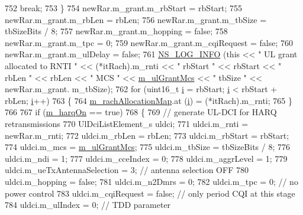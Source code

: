 \begin{DoxyCode}
752           \textcolor{keywordflow}{break};
753         \}
754       newRar.m\_grant.m\_rbStart = rbStart;
755       newRar.m\_grant.m\_rbLen = rbLen;
756       newRar.m\_grant.m\_tbSize = tbSizeBits / 8;
757       newRar.m\_grant.m\_hopping = \textcolor{keyword}{false};
758       newRar.m\_grant.m\_tpc = 0;
759       newRar.m\_grant.m\_cqiRequest = \textcolor{keyword}{false};
760       newRar.m\_grant.m\_ulDelay = \textcolor{keyword}{false};
761       \hyperlink{group__logging_gafbd73ee2cf9f26b319f49086d8e860fb}{NS\_LOG\_INFO} (\textcolor{keyword}{this} << \textcolor{stringliteral}{" UL grant allocated to RNTI "} << (*itRach).m\_rnti << \textcolor{stringliteral}{" rbStart "} << 
      rbStart << \textcolor{stringliteral}{" rbLen "} << rbLen << \textcolor{stringliteral}{" MCS "} << \hyperlink{classns3_1_1PfFfMacScheduler_a915ee203b48875c6cb276bb46d866c2b}{m\_ulGrantMcs} << \textcolor{stringliteral}{" tbSize "} << newRar.m\_grant.
      m\_tbSize);
762       \textcolor{keywordflow}{for} (uint16\_t \hyperlink{bernuolliDistribution_8m_a6f6ccfcf58b31cb6412107d9d5281426}{i} = rbStart; \hyperlink{bernuolliDistribution_8m_a6f6ccfcf58b31cb6412107d9d5281426}{i} < rbStart + rbLen; \hyperlink{bernuolliDistribution_8m_a6f6ccfcf58b31cb6412107d9d5281426}{i}++)
763         \{
764           \hyperlink{classns3_1_1PfFfMacScheduler_a755c1bfd84bd392a07aa370cb4ced071}{m\_rachAllocationMap}.at (\hyperlink{bernuolliDistribution_8m_a6f6ccfcf58b31cb6412107d9d5281426}{i}) = (*itRach).m\_rnti;
765         \}
766       
767       \textcolor{keywordflow}{if} (\hyperlink{classns3_1_1PfFfMacScheduler_a20ee9882187d440870b2a88b63fcb7e9}{m\_harqOn} == \textcolor{keyword}{true})
768         \{
769           \textcolor{comment}{// generate UL-DCI for HARQ retransmissions}
770           UlDciListElement\_s uldci;
771           uldci.m\_rnti = newRar.m\_rnti;
772           uldci.m\_rbLen = rbLen;
773           uldci.m\_rbStart = rbStart;
774           uldci.m\_mcs = \hyperlink{classns3_1_1PfFfMacScheduler_a915ee203b48875c6cb276bb46d866c2b}{m\_ulGrantMcs};
775           uldci.m\_tbSize = tbSizeBits / 8;
776           uldci.m\_ndi = 1;
777           uldci.m\_cceIndex = 0;
778           uldci.m\_aggrLevel = 1;
779           uldci.m\_ueTxAntennaSelection = 3; \textcolor{comment}{// antenna selection OFF}
780           uldci.m\_hopping = \textcolor{keyword}{false};
781           uldci.m\_n2Dmrs = 0;
782           uldci.m\_tpc = 0; \textcolor{comment}{// no power control}
783           uldci.m\_cqiRequest = \textcolor{keyword}{false}; \textcolor{comment}{// only period CQI at this stage}
784           uldci.m\_ulIndex = 0; \textcolor{comment}{// TDD parameter}

\end{DoxyCode}
